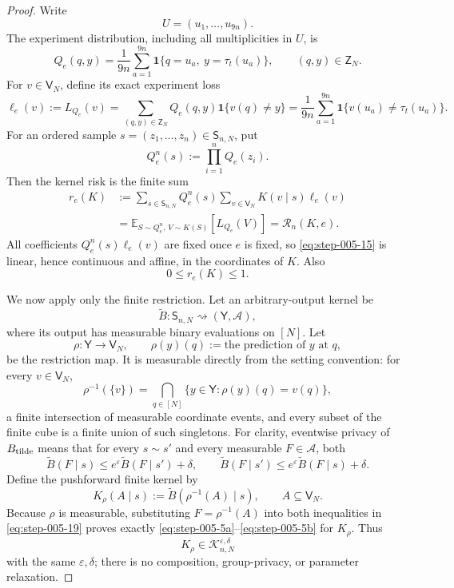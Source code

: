 \begin{proof}

Write
\[
U=(u_1,\ldots,u_{9n}).
\]
The experiment distribution, including all multiplicities in \(U\), is
\[
Q_e(q,y)
=
\frac1{9n}\sum_{a=1}^{9n}
\mathbf 1\{q=u_a,\ y=\tau_t(u_a)\},
\qquad (q,y)\in\mathsf Z_N.
\tag{12}\label{eq:step-005-12}
\]
For \(v \in \mathsf V_N\), define its exact experiment loss
\[
\ell_e(v)
:=L_{Q_e}(v)
=\sum_{(q,y)\in\mathsf Z_N}Q_e(q,y)\mathbf 1\{v(q)\ne y\}
=\frac1{9n}\sum_{a=1}^{9n}
\mathbf 1\{v(u_a)\ne\tau_t(u_a)\}.
\tag{13}\label{eq:step-005-13}
\]
For an ordered sample
\(s=(z_1,\ldots,z_n)\in\mathsf S_{n,N}\), put
\[
Q_e^n(s):=\prod_{i=1}^nQ_e(z_i).
\tag{14}\label{eq:step-005-14}
\]
Then the kernel risk is the finite sum
\[
\begin{aligned}
r_e(K)
&:=\sum_{s\in\mathsf S_{n,N}}Q_e^n(s)
\sum_{v\in\mathsf V_N}K(v\mid s)\ell_e(v)\\
&=\mathbb E_{S\sim Q_e^n,\,V\sim K(S)}[L_{Q_e}(V)]
=\mathcal R_n(K,e).
\end{aligned}
\tag{15}\label{eq:step-005-15}
\]
All coefficients
\(Q_e^n(s)\ell_e(v)\) are fixed once \(e\) is fixed, so \eqref{eq:step-005-15} is linear, hence continuous and affine, in the coordinates of \(K\). Also
\[
0\le r_e(K)\le1.
\tag{16}\label{eq:step-005-16}
\]

We now apply only the finite restriction. Let an arbitrary-output kernel be
\[
\widetilde B:\mathsf S_{n,N}\rightsquigarrow(\mathsf Y,\mathcal A),
\tag{17}\label{eq:step-005-17}
\]
where its output has measurable binary evaluations on \([N]\). Let
\[
\rho:\mathsf Y\longrightarrow\mathsf V_N,
\qquad
\rho(y)(q):=\text{the prediction of }y\text{ at }q,
\tag{18}\label{eq:step-005-18}
\]
be the restriction map. It is measurable directly from the setting convention: for every \(v \in \mathsf V_N\),
\[
\rho^{-1}(\{v\})
=\bigcap_{q\in[N]}
\{y\in\mathsf Y:\rho(y)(q)=v(q)\},
\tag{18a}\label{eq:step-005-18a}
\]
a finite intersection of measurable coordinate events, and every subset of the finite cube is a finite union of such singletons. For clarity, eventwise privacy of
\(B_{\rm tilde}\) means that for every \(s \sim s'\) and every measurable
\(F\in\mathcal A\), both
\[
\widetilde B(F\mid s)
\le e^\varepsilon\widetilde B(F\mid s')+\delta,
\qquad
\widetilde B(F\mid s')
\le e^\varepsilon\widetilde B(F\mid s)+\delta.
\tag{19}\label{eq:step-005-19}
\]
Define the pushforward finite kernel by
\[
K_\rho(A\mid s)
:=\widetilde B(\rho^{-1}(A)\mid s),
\qquad A\subseteq\mathsf V_N.
\tag{20}\label{eq:step-005-20}
\]
Because \(\rho\) is measurable, substituting
\(F=\rho^{-1}(A)\) into both inequalities in \eqref{eq:step-005-19} proves exactly \eqref{eq:step-005-5a}--\eqref{eq:step-005-5b} for \(K_\rho\). Thus
\[
K_\rho\in\mathcal K_{n,N}^{\varepsilon,\delta}
\tag{21}\label{eq:step-005-21}
\]
with the same \(\varepsilon,\delta\); there is no composition, group-privacy, or parameter relaxation.


\end{proof}
